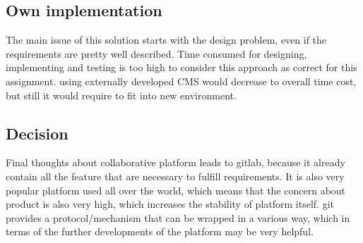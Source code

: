 	\subsection{Own implementation}
		The main issue of this solution starts with the design problem, even if the requirements are pretty well described. Time consumed for designing, implementing and testing is too high to consider this approach as correct for this assignment. using externally developed \gls{CMS} would decrease to overall time cost, but still it would require to fit into new environment.
	\subsection{Decision}
		Final thoughts about collaborative platform leads to \gls{gitlab}, because it already contain all the feature that are necessary to fulfill requirements. It is also very popular platform used all over the world, which means that the concern about product is also very high, which increases the stability of platform itself. \gls{git} provides a protocol/mechanism that can be wrapped in a various way, which in terms of the further developments of the platform may be very helpful. 